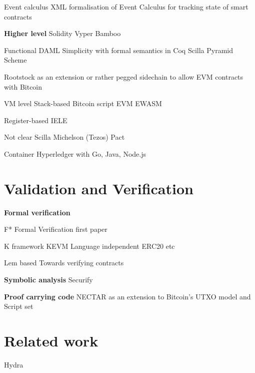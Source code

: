 \documentclass{article}
\begin{document}
Event calculus
XML formalisation of Event Calculus for tracking state of smart contracts \cite{Farrell2004}

\textbf{Higher level}
Solidity \cite{Ethereum2018Solidity}
Vyper \cite{Ethereum2018Vyper}
Bamboo \cite{Hirai2018Bamboo}




Functional
DAML \cite{Shaul2018,Meier2018,Lippmeier2018,Huschenbett2018,Bernauer2018,Maric2018,Bleikertz2018,Lochbihler2018,Pilav2018}
Simplicity \cite{OConnor2017} with formal semantics in Coq
Scilla \cite{Sergey2018}
Pyramid Scheme \cite{Burge2018}

Rootstock as an extension or rather pegged sidechain to allow EVM contracts with Bitcoin \cite{Lerner2015}

VM level
Stack-based
Bitcoin script \cite{BitcoinWiki2018Script}
EVM \cite{Wood2014}
EWASM \cite{Wanderer2015,EthereumFoundation2018ewasm}

Register-based
IELE \cite{Kasampalis2018}

Not clear
Scilla \cite{Sergey2018}
Michelson (Tezos) \cite{DynamicLedgerSolutions2017}
Pact \cite{Popejoy2017}

Container
Hyperledger with Go, Java, Node.js \cite{Cachin2016}

\section{Validation and Verification}
\textbf{Formal verification}

F*
Formal Verification first paper \cite{Bhargavan2016}

K framework \cite{Rosu2007} 
KEVM \cite{Hildenbrandt2017}
Language independent \cite{Chen2018}
ERC20 etc \cite{Park2018}

Lem based
Towards verifying contracts \cite{Amani2018}




\textbf{Symbolic analysis}
Securify \cite{Tsankov2017}




\textbf{Proof carrying code}
NECTAR as an extension to Bitcoin's UTXO model and Script set \cite{Covaci2018}



\section{Related work}
Hydra \cite{Breidenbach2018}




\end{document}

